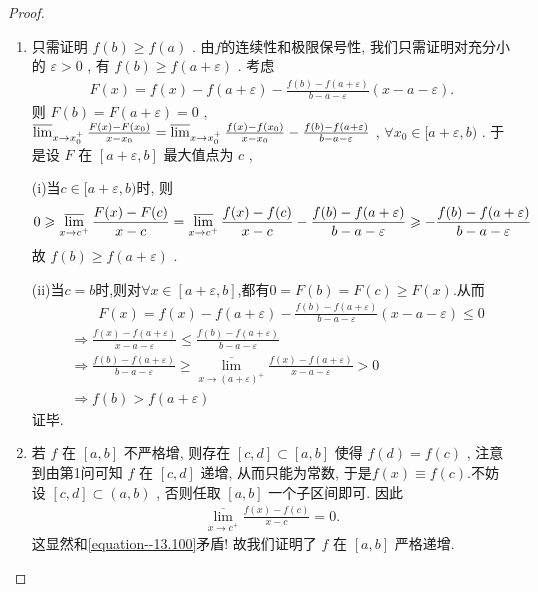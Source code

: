 \documentclass[../../main.tex]{subfiles}%
\begin{document}
\begin{proof}
\begin{enumerate}
\item 只需证明 \(f(b) \geqslant  f(a)\) . 由$f$的连续性和极限保号性, 我们只需证明对充分小的 \(\varepsilon > 0\) , 有 \(f(b) \geqslant  f(a + \varepsilon)\) . 考虑
\begin{align*}
F(x) = f(x) - f(a + \varepsilon) - \frac{f(b) - f(a + \varepsilon)}{b - a - \varepsilon}(x - a - \varepsilon).
\end{align*}
则
\(F(b) = F(a + \varepsilon) = 0\) , \(\varlimsup_{x \to x_0^+} \frac{F(x) - F(x_0)}{x - x_0} = \varlimsup_{x \to x_0^+} \frac{f(x) - f(x_0)}{x - x_0} - \frac{f(b) - f(a + \varepsilon)}{b - a - \varepsilon}\) , \(\forall x_0 \in [a + \varepsilon, b)\) .
于是设 \(F\) 在 \([a + \varepsilon, b]\) 最大值点为 \(c \) ,

(i)当$c\in [a + \varepsilon, b)$时, 则
\begin{align*}
0 \geqslant  \varlimsup_{x \to c^+} \frac{F(x) - F(c)}{x - c} = \varlimsup_{x \to c^+} \frac{f(x) - f(c)}{x - c} - \frac{f(b) - f(a + \varepsilon)}{b - a - \varepsilon} \geqslant  - \frac{f(b) - f(a + \varepsilon)}{b - a - \varepsilon}
\end{align*}
故 \(f(b) \geqslant  f(a + \varepsilon)\) . 

(ii)当$c=b$时,则对$\forall x\in [a+\varepsilon,b]$,都有$0=F(b)=F(c)\geqslant F(x)$.从而
\begin{align*}
&\quad \quad F(x)=f(x)-f(a+\varepsilon )-\frac{f(b)-f(a+\varepsilon )}{b-a-\varepsilon}(x-a-\varepsilon )\leqslant 0
\\
&\Rightarrow \frac{f(x)-f(a+\varepsilon )}{x-a-\varepsilon}\leqslant \frac{f(b)-f(a+\varepsilon )}{b-a-\varepsilon}
\\
&\Rightarrow \frac{f(b)-f(a+\varepsilon )}{b-a-\varepsilon}\geqslant \underset{x\rightarrow \left( a+\varepsilon \right) ^+}{\overline{\lim }}\frac{f(x)-f(a+\varepsilon )}{x-a-\varepsilon}>0
\\
&\Rightarrow f(b)>f(a+\varepsilon )
\end{align*}
证毕.

\item 若 \(f\) 在 \([a, b]\) 不严格增, 则存在 \([c, d] \subset [a, b]\) 使得 \(f(d) = f(c)\) , 注意到由第1问可知 \(f\) 在 \([c, d]\) 递增, 从而只能为常数, 于是$f(x)\equiv f(c)$.不妨设 \([c, d] \subset (a, b)\) , 否则任取 \([a, b]\) 一个子区间即可. 因此
\begin{align*}
\underset{x\rightarrow c^+}{\overline{\lim }}\frac{f(x)-f(c)}{x-c}=0.
\end{align*}
这显然和\eqref{equation--13.100}矛盾! 故我们证明了 \(f\) 在 \([a, b]\) 严格递增.


\end{enumerate}
\end{proof}
\end{document}
